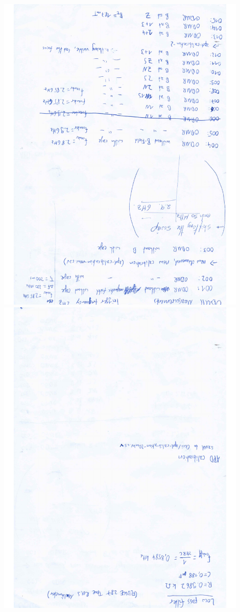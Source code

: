 \includegraphics[width=0.9\textwidth,angle=180]{../labbook/labbook-5.pdf}
\includegraphics[width=0.9\textwidth,angle=180]{../labbook/labbook-6.pdf}
